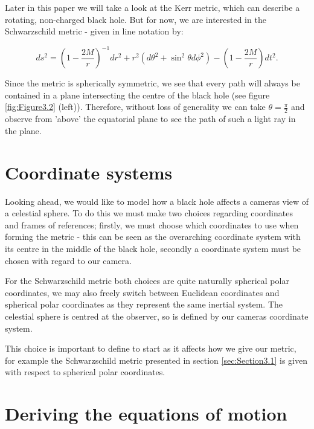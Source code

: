 \documentclass[oneside,openright,frontopenright, singlespacing]{dmathesis}
\begin{document}
\vspace{1em}
Later in this paper we will take a look at the Kerr metric, which can describe a rotating, non-charged black hole. But for now, we are interested in the Schwarzschild metric - given in line notation by: 

	\[{ds^{2} = {\left(1-\frac {2M}{r}\right)}^{-1}} {dr^2} + {r^2}({d\theta ^2} + {\sin ^2}{\theta}{d\phi ^2}) -{\left(1-\frac {2M}{r}\right)}{dt^2}.\]

\vspace{1em}
	Since the metric is spherically symmetric, we see that every path will always be contained in a plane intersecting the centre of the black hole (see figure \ref{fig:Figure3.2} (left)). Therefore, without loss of generality we can take ${\theta}=\frac{\pi}{2}$ and observe from 'above’ the equatorial plane to see the path of such a light ray in the plane.

\section{Coordinate systems}\label{sec:Section3.2}

	Looking ahead, we would like to model how a black hole affects a cameras view of a celestial sphere. To do this we must make two choices regarding coordinates and frames of references; firstly, we must choose which coordinates to use when forming the metric - this can be seen as the overarching coordinate system with its centre in the middle of the black hole, secondly a coordinate system must be chosen with regard to our camera.

\vspace{1em}
	For the Schwarzschild metric both choices are quite naturally spherical polar coordinates, we may also freely switch between Euclidean coordinates and spherical polar coordinates as they represent the same inertial system. The celestial sphere is centred at the observer, so is defined by our cameras coordinate system.

\vspace{1em}
	This choice is important to define to start as it affects how we give our metric, for example the Schwarzschild metric presented in section \ref{sec:Section3.1} is given with respect to spherical polar coordinates.

\section{Deriving the equations of motion}\label{sec:Section3.3}
	
\end{document}
